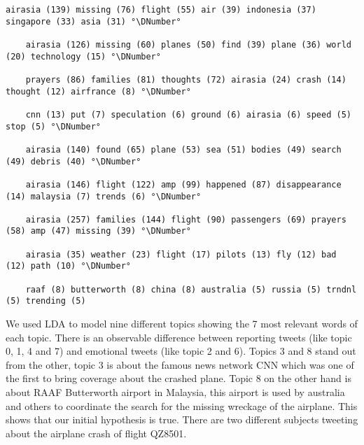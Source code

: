 \begin{lstlisting}[caption={[Topic Model for Air Asia Flight Tragedy] Topic Model for Air Asia Flight Tragedy}, label={lst:topic-model-air-asia}, float=h]
	airasia (139) missing (76) flight (55) air (39) indonesia (37) singapore (33) asia (31) °\DNumber°

	airasia (126) missing (60) planes (50) find (39) plane (36) world (20) technology (15) °\DNumber°

	prayers (86) families (81) thoughts (72) airasia (24) crash (14) thought (12) airfrance (8) °\DNumber°

	cnn (13) put (7) speculation (6) ground (6) airasia (6) speed (5) stop (5) °\DNumber°

	airasia (140) found (65) plane (53) sea (51) bodies (49) search (49) debris (40) °\DNumber°

	airasia (146) flight (122) amp (99) happened (87) disappearance (14) malaysia (7) trends (6) °\DNumber°

	airasia (257) families (144) flight (90) passengers (69) prayers (58) amp (47) missing (39) °\DNumber°

	airasia (35) weather (23) flight (17) pilots (13) fly (12) bad (12) path (10) °\DNumber°

	raaf (8) butterworth (8) china (8) australia (5) russia (5) trndnl (5) trending (5)
\end{lstlisting}


We used LDA to model nine different topics showing the 7 most relevant words of each topic. There is an observable difference between reporting tweets (like topic 0, 1, 4 and 7) and emotional tweets (like topic 2 and 6). Topics 3 and 8 stand out from the other, topic 3 is about the famous news network CNN which was one of the first to bring coverage about the crashed plane. Topic 8 on the other hand is about RAAF Butterworth airport in Malaysia, this airport is used by australia and others to coordinate the search for the missing wreckage of the airplane.
This shows that our initial hypothesis is true. There are two different subjects tweeting about the airplane crash of flight QZ8501.


